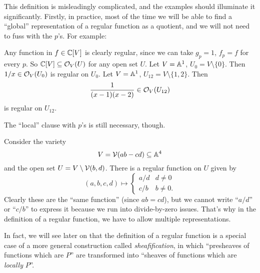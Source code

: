 This definition is misleadingly complicated,
and the examples should illuminate it significantly.
Firstly, in practice, most of the time we will be able to find
a ``global'' representation of a regular function as a quotient,
and we will not need to fuss with the $p$'s.
For example:
\begin{example}
	\listhack
	\begin{enumerate}[(a)]
		\ii Any function in $f \in \mathbb C[V]$ is clearly regular,
		since we can take $g_p = 1$, $f_p = f$ for every $p$.
		So $\mathbb C[V] \subseteq \mathcal O_V(U)$ for any open set $U$.
		\ii Let $V = \mathbb A^1$, $U_0 = V \setminus \{0\}$.
		Then $1/x \in \mathcal O_V(U_0)$ is regular on $U_0$.
		\ii Let $V = \mathbb A^1$, $U_{12} = V \setminus \{1,2\}$. Then
		\[ \frac{1}{(x-1)(x-2)} \in \mathcal O_V(U_{12}) \]
		is regular on $U_{12}$.
	\end{enumerate}
\end{example}
The ``local'' clause with $p$'s is still necessary, though.
\begin{example}
	\label{ex:local_rep}
	Consider the variety
	\[ V = \mathcal V(ab-cd) \subseteq \mathbb A^4 \]
	and the open set $U = V \setminus \mathcal V(b,d)$.
	There is a regular function on $U$ given by
	\[
		(a,b,c,d)
		\mapsto
		\begin{cases}
			a/d & d \neq 0 \\
			c/b & b \neq 0.
		\end{cases}
	\]
	Clearly these are the ``same function'' (since $ab=cd$),
	but we cannot write ``$a/d$'' or ``$c/b$''
	to express it because we run into divide-by-zero issues.
	That's why in the definition of a regular function,
	we have to allow multiple representations.
\end{example}

In fact, we will see later on that the definition
of a regular function is a special case of a more
general construction called \emph{sheafification},
in which ``presheaves of functions which are $P$'' are transformed
into ``sheaves of functions which are \emph{locally} $P$''.

